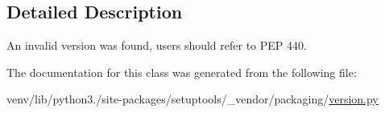 \subsection{Detailed Description}
\begin{DoxyVerb}An invalid version was found, users should refer to PEP 440.
\end{DoxyVerb}
 

The documentation for this class was generated from the following file\+:\begin{DoxyCompactItemize}
\item 
venv/lib/python3./site-\/packages/setuptools/\+\_\+vendor/packaging/\hyperlink{setuptools_2__vendor_2packaging_2version_8py}{version.\+py}\end{DoxyCompactItemize}
